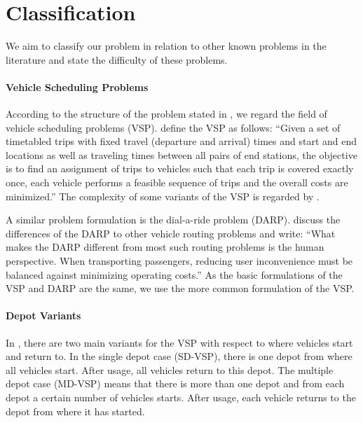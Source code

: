 
\section{Classification}
\label{sec:classification}

We aim to classify our problem in relation to other known problems in the literature and state the difficulty of these problems.

\paragraph{Vehicle Scheduling Problems} \parfill

According to the structure of the problem stated in , we regard the field of vehicle scheduling problems (VSP). \cite{Bunte_Kliewer} define the VSP as follows: \enquote{Given a set of timetabled trips with fixed travel (departure and arrival) times and start and end locations as well as traveling times between all pairs of end stations, the objective is to find an assignment of trips to vehicles such that each trip is covered exactly once, each vehicle performs a feasible sequence of trips and the overall costs are minimized.} The complexity of some variants of the VSP is regarded by \cite{Lenstra_Kan}.

A similar problem formulation is the dial-a-ride problem (DARP). \cite{Cordeau_Laporte} discuss the differences of the DARP to other vehicle routing problems and write: \enquote{What makes the DARP different from most such routing problems is the human perspective. When transporting passengers, reducing user inconvenience must be balanced against minimizing operating costs.} As the basic formulations of the VSP and DARP are the same, we use the more common formulation of the VSP.

\paragraph{Depot Variants} \parfill 

In \cite{Bunte_Kliewer}, there are two main variants for the VSP with respect to where vehicles start and return to. In the single depot case (SD-VSP), there is one depot from where all vehicles start. After usage, all vehicles return to this depot. The multiple depot case (MD-VSP) means that there is more than one depot and from each depot a certain number of vehicles starts. After usage, each vehicle returns to the depot from where it has started. 

